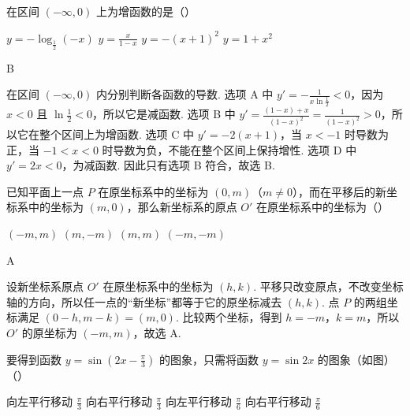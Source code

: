\begin{problem}
在区间 \((-\infty,0)\) 上为增函数的是（\quad）

\choices
    {\(y = -\log_{\frac{1}{2}}(-x)\)}
    {\(y = \frac{x}{1 - x}\)}
    {\(y = -(x + 1)^2\)}
    {\(y = 1 + x^2\)}
\end{problem}

\begin{answer}
B
\end{answer}

\begin{solution}
在区间 \((-\infty,0)\) 内分别判断各函数的导数. 选项 A 中 \(y'=-\frac{1}{x\ln\frac12}<0\)，因为 \(x<0\) 且 \(\ln\frac12<0\)，所以它是减函数. 选项 B 中 \(y'=\frac{(1-x)+x}{(1-x)^2}=\frac{1}{(1-x)^2}>0\)，所以它在整个区间上为增函数. 选项 C 中 \(y'=-2(x+1)\)，当 \(x<-1\) 时导数为正，当 \(-1<x<0\) 时导数为负，不能在整个区间上保持增性. 选项 D 中 \(y'=2x<0\)，为减函数. 因此只有选项 B 符合，故选 B.
\end{solution}

\begin{problem}
已知平面上一点 \(P\) 在原坐标系中的坐标为 \((0,m)\)（\(m \neq 0\)），而在平移后的新坐标系中的坐标为 \((m,0)\)，那么新坐标系的原点 \(O'\) 在原坐标系中的坐标为（\quad）

\choices
    {\((-m,m)\)}
    {\((m,-m)\)}
    {\((m,m)\)}
    {\((-m,-m)\)}
\end{problem}

\begin{answer}
A
\end{answer}

\begin{solution}
设新坐标系原点 \(O'\) 在原坐标系中的坐标为 \((h,k)\). 平移只改变原点，不改变坐标轴的方向，所以任一点的“新坐标”都等于它的原坐标减去 \((h,k)\). 点 \(P\) 的两组坐标满足 \((0-h,m-k)=(m,0)\). 比较两个坐标，得到 \(h=-m\)，\(k=m\)，所以 \(O'\) 的原坐标为 \((-m,m)\)，故选 A.
\end{solution}

\begin{problem}
要得到函数 \(y = \sin \left(2x - \frac{\pi}{3}\right)\) 的图象，只需将函数 \(y = \sin 2x\) 的图象（如图）（\quad）


\choices
    {向左平行移动 \(\frac{\pi}{3}\)}
    {向右平行移动 \(\frac{\pi}{3}\)}
    {向左平行移动 \(\frac{\pi}{6}\)}
    {向右平行移动 \(\frac{\pi}{6}\)}
\end{problem}

